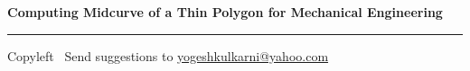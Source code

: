 
\graphicspath{{images/}}

\footnotesize


\begin{center}
\Large{\textbf{Computing Midcurve of a Thin Polygon for Mechanical Engineering}}  
\end{center}

\begin{multicols}{2}

\end{multicols}

\rule{\linewidth}{0.25pt}
\scriptsize
Copyleft \textcopyleft\  Send suggestions to 
\href{http://www.yogeshkulkarni.com}{yogeshkulkarni@yahoo.com}


